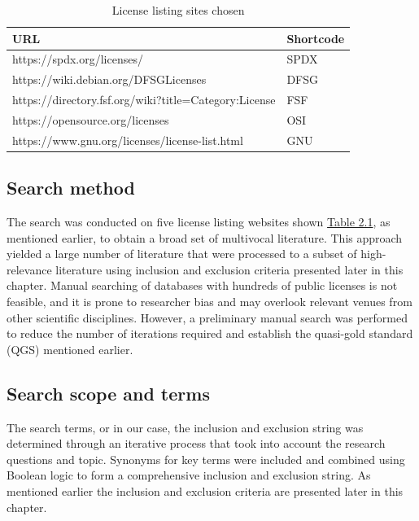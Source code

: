 \begin{table}[t]
  \caption{License listing sites chosen}
	\begin{center}
		\begin{tabular}{||l l||}
			\hline
			URL & Shortcode \\
			\hline
      https://spdx.org/licenses/ & SPDX \\
      https://wiki.debian.org/DFSGLicenses & DFSG \\
      https://directory.fsf.org/wiki?title=Category:License & FSF \\
      https://opensource.org/licenses & OSI \\
      https://www.gnu.org/licenses/license-list.html & GNU \\
			\hline
		\end{tabular}
		\label{table:listing-sites}
	\end{center}
\end{table}

\subsection{Search method}
The search was conducted on five license listing websites shown \hyperref[table:listing-sites]{Table 2.1}, as mentioned earlier, to obtain a broad set of multivocal literature. This approach yielded a large number of literature that were processed to a subset of high-relevance literature using inclusion and exclusion criteria presented later in this chapter. Manual searching of databases with hundreds of public licenses is not feasible, and it is prone to researcher bias and may overlook relevant venues from other scientific disciplines. However, a preliminary manual search was performed to reduce the number of iterations required and establish the quasi-gold standard (QGS) mentioned earlier.

\subsection{Search scope and terms}
The search terms, or in our case, the inclusion and exclusion string was determined through an iterative process that took into account the research questions and topic. Synonyms for key terms were included and combined using Boolean logic to form a comprehensive inclusion and exclusion string. As mentioned earlier the inclusion and exclusion criteria are presented later in this chapter.


